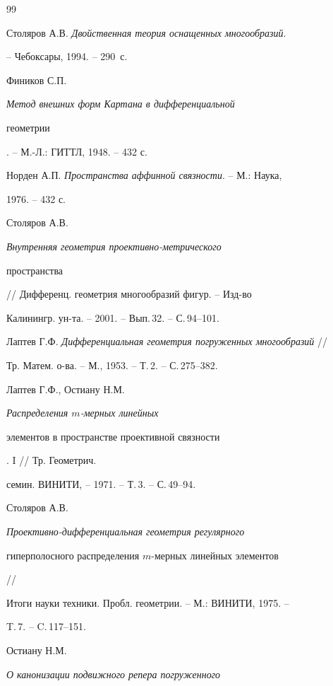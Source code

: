  


 


\begin{thebibliography}{99} 


 




Столяров А.В. {\em Двойственная теория оснащенных многообразий}. 


-- Чебоксары, 1994. -- 290~с. 




Фиников С.П. {\em Метод внешних форм Картана в дифференциальной 


геометрии}. -- М.-Л.: ГИТТЛ, 1948. -- 432 с. 




Норден А.П. {\em Пространства аффинной связности}. -- М.: Наука, 


1976. -- 432 с. 




Столяров А.В. {\em Внутренняя геометрия проективно-метрического 


пространства} // Дифференц. геометрия многообразий фигур. -- Изд-во 


Калинингр. ун-та. -- 2001. -- Вып.\,32. -- С.\,94--101. 




Лаптев Г.Ф. {\em Дифференциальная геометрия погруженных многообразий} // 


Тр. Матем. о-ва. -- М., 1953. -- Т.\,2. -- С.\,275--382. 




Лаптев Г.Ф., Остиану Н.М. {\em Распределения $m$-мерных линейных 


элементов в пространстве проективной связности}. I // Тр. Геометрич. 


семин. ВИНИТИ, -- 1971. -- Т.\,3. -- С.\,49--94. 




Столяров А.В. {\em Проективно-дифференциальная геометрия регулярного 


гиперполосного распределения $m$-мерных линейных элементов} //


Итоги науки техники. Пробл. геометрии. -- М.: ВИНИТИ, 1975. --


T.\,7. -- C.\,117--151.




Остиану Н.М. {\em О канонизации подвижного репера погруженного 


}
\end{thebibliography}
